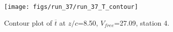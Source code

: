 \begin{figure}[H]
\centering
\texttt{[image: figs/run\_37/run\_37\_T\_contour]}
\caption{Contour plot of $\overline{t}$ at $z/c$=8.50, $V_{free}$=27.09, station 4.}
\label{fig:run_37_T_contour}
\end{figure}


